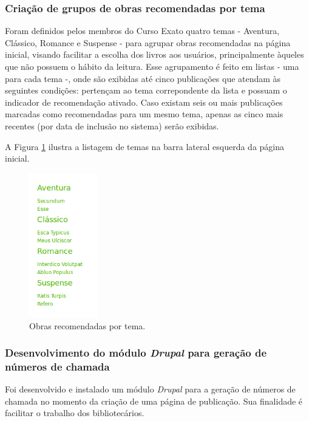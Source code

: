 \documentclass[a4paper]{article}
\begin{document}
\subsubsection{Criação de grupos de obras recomendadas por tema}\label{sssec:srecommended}
Foram definidos pelos membros do Curso Exato quatro temas - Aventura, Clássico, Romance e Suspense - para agrupar obras recomendadas na página inicial, visando facilitar a escolha dos livros aos usuários, principalmente àqueles que não possuem o hábito da leitura. Esse agrupamento é feito em listas - uma para cada tema -, onde são exibidas até cinco publicações que atendam às seguintes condições: pertençam ao tema correpondente da lista e possuam o indicador de recomendação ativado. Caso existam seis ou mais publicações marcadas como recomendadas para um mesmo tema, apenas as cinco mais recentes (por data de inclusão no sistema) serão exibidas.

A Figura \ref{recommended} ilustra a listagem de temas na barra lateral esquerda da página inicial.

\begin{figure}[pbth!]
\centering
\includegraphics[width=30mm]{img/leftsidebar-close.png}
\caption{Obras recomendadas por tema.\label{recommended}}
\end{figure}

\subsubsection{Desenvolvimento do módulo \textit{Drupal} para geração de números de chamada}

Foi desenvolvido e instalado um módulo \textit{Drupal} para a geração de números de chamada no momento da criação de uma página de publicação. Sua finalidade é facilitar o trabalho dos bibliotecários.
\end{document}
